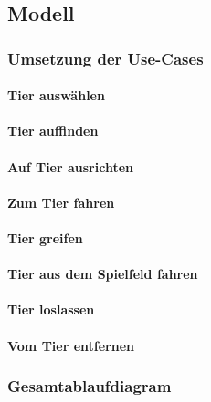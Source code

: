 \subsection{Modell}

\subsubsection{Umsetzung der Use-Cases}

\paragraph{Tier auswählen}

\paragraph{Tier auffinden}

\paragraph{Auf Tier ausrichten}

\paragraph{Zum Tier fahren}

\paragraph{Tier greifen}

\paragraph{Tier aus dem Spielfeld fahren}

\paragraph{Tier loslassen}

\paragraph{Vom Tier entfernen}

\subsubsection{Gesamtablaufdiagram}